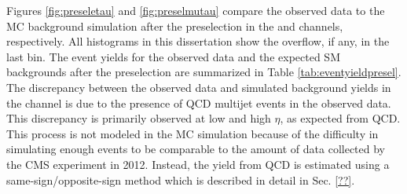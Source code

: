 Figures \ref{fig:preseletau} and \ref{fig:preselmutau} compare the observed data to the MC background simulation after the preselection in the \etau and \mutau channels, respectively. All histograms in this dissertation show the overflow, if any, in the last bin. The event yields for the observed data and the expected SM backgrounds after the preselection are summarized in Table \ref{tab:eventyieldpresel}. The discrepancy between the observed data and simulated background yields in the \etau channel is due to the presence of QCD multijet events in the observed data. This discrepancy is primarily observed at low \pt and high $\eta$, as expected from QCD. This process is not modeled in the MC simulation because of the difficulty in simulating enough events to be comparable to the amount of data collected by the CMS experiment in 2012. Instead, the yield from QCD is estimated using a same-sign/opposite-sign method which is described in detail in Sec. \ref{??}.

